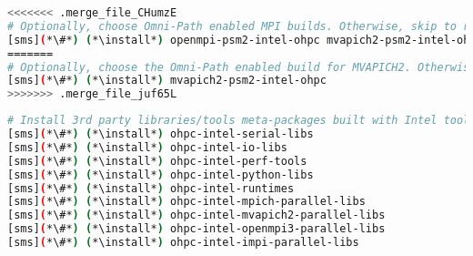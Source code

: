 \begin{lstlisting}[language=bash,keywords={},upquote=true,keepspaces]
<<<<<<< .merge_file_CHumzE
# Optionally, choose Omni-Path enabled MPI builds. Otherwise, skip to retain default MPI stacks
[sms](*\#*) (*\install*) openmpi-psm2-intel-ohpc mvapich2-psm2-intel-ohpc
=======
# Optionally, choose the Omni-Path enabled build for MVAPICH2. Otherwise, skip to retain IB variant
[sms](*\#*) (*\install*) mvapich2-psm2-intel-ohpc
>>>>>>> .merge_file_juf65L
\end{lstlisting}

\begin{lstlisting}[language=bash,keywords={},upquote=true,keepspaces]
# Install 3rd party libraries/tools meta-packages built with Intel toolchain
[sms](*\#*) (*\install*) ohpc-intel-serial-libs
[sms](*\#*) (*\install*) ohpc-intel-io-libs
[sms](*\#*) (*\install*) ohpc-intel-perf-tools
[sms](*\#*) (*\install*) ohpc-intel-python-libs
[sms](*\#*) (*\install*) ohpc-intel-runtimes
[sms](*\#*) (*\install*) ohpc-intel-mpich-parallel-libs
[sms](*\#*) (*\install*) ohpc-intel-mvapich2-parallel-libs
[sms](*\#*) (*\install*) ohpc-intel-openmpi3-parallel-libs
[sms](*\#*) (*\install*) ohpc-intel-impi-parallel-libs
\end{lstlisting}

